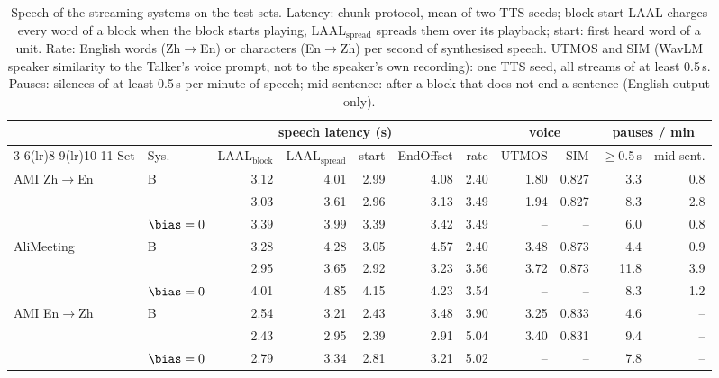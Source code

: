 \begin{table}[t]
\centering\small
\setlength{\tabcolsep}{3.5pt}
\begin{tabular}{llrrrrrrrrr}
\toprule
 & & \multicolumn{4}{c}{speech latency (s)} & & \multicolumn{2}{c}{voice} & \multicolumn{2}{c}{pauses / min} \\
\cmidrule(lr){3-6}\cmidrule(lr){8-9}\cmidrule(lr){10-11}
Set & Sys. & LAAL$_\text{block}$ & LAAL$_\text{spread}$ & start & EndOffset & rate & UTMOS & SIM & $\ge$0.5\,s & mid-sent. \\
\midrule
AMI Zh$\rightarrow$En & B & 3.12 & 4.01 & 2.99 & 4.08 & 2.40 & 1.80 & 0.827 & 3.3 & 0.8 \\
 & \sys{} & 3.03 & 3.61 & 2.96 & 3.13 & 3.49 & 1.94 & 0.827 & 8.3 & 2.8 \\
 & $\bias=0$ & 3.39 & 3.99 & 3.39 & 3.42 & 3.49 & -- & -- & 6.0 & 0.8 \\
\midrule
AliMeeting & B & 3.28 & 4.28 & 3.05 & 4.57 & 2.40 & 3.48 & 0.873 & 4.4 & 0.9 \\
 & \sys{} & 2.95 & 3.65 & 2.92 & 3.23 & 3.56 & 3.72 & 0.873 & 11.8 & 3.9 \\
 & $\bias=0$ & 4.01 & 4.85 & 4.15 & 4.23 & 3.54 & -- & -- & 8.3 & 1.2 \\
\midrule
AMI En$\rightarrow$Zh & B & 2.54 & 3.21 & 2.43 & 3.48 & 3.90 & 3.25 & 0.833 & 4.6 & -- \\
 & \sys{} & 2.43 & 2.95 & 2.39 & 2.91 & 5.04 & 3.40 & 0.831 & 9.4 & -- \\
 & $\bias=0$ & 2.79 & 3.34 & 2.81 & 3.21 & 5.02 & -- & -- & 7.8 & -- \\
\bottomrule
\end{tabular}
\caption{Speech of the streaming systems on the test sets. Latency: chunk protocol, mean of two TTS seeds; block-start LAAL charges every word of a block when the block starts playing, LAAL$_\text{spread}$ spreads them over its playback; start: first heard word of a unit. Rate: English words (Zh$\rightarrow$En) or characters (En$\rightarrow$Zh) per second of synthesised speech. UTMOS and SIM (WavLM speaker similarity to the Talker's voice prompt, not to the speaker's own recording): one TTS seed, all streams of at least 0.5\,s. Pauses: silences of at least 0.5\,s per minute of speech; mid-sentence: after a block that does not end a sentence (English output only).}
\label{tab:speech}
\end{table}

